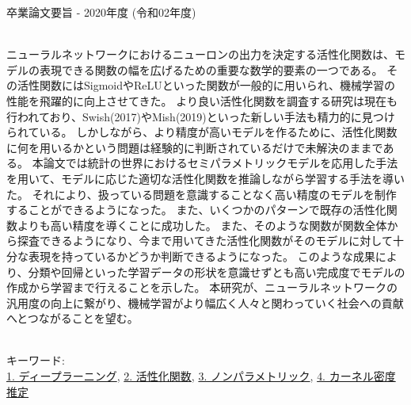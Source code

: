 卒業論文要旨 - 2020年度 (令和02年度)
\begin{center}
\begin{large}
\end{large}
\end{center}

~ \\



ニューラルネットワークにおけるニューロンの出力を決定する活性化関数は、モデルの表現できる関数の幅を広げるための重要な数学的要素の一つである。
その活性関数にはSigmoidやReLUといった関数が一般的に用いられ、機械学習の性能を飛躍的に向上させてきた。
より良い活性化関数を調査する研究は現在も行われており、Swish(2017)やMish(2019)といった新しい手法も精力的に見つけられている。
しかしながら、より精度が高いモデルを作るために、活性化関数に何を用いるかという問題は経験的に判断されているだけで未解決のままである。
本論文では統計の世界におけるセミパラメトリックモデルを応用した手法を用いて、モデルに応じた適切な活性化関数を推論しながら学習する手法を導いた。
それにより、扱っている問題を意識することなく高い精度のモデルを制作することができるようになった。
また、いくつかのパターンで既存の活性化関数よりも高い精度を導くことに成功した。
また、そのような関数が関数全体から探査できるようになり、今まで用いてきた活性化関数がそのモデルに対して十分な表現を持っているかどうか判断できるようになった。
このような成果により、分類や回帰といった学習データの形状を意識せずとも高い完成度でモデルの作成から学習まで行えることを示した。
本研究が、ニューラルネットワークの汎用度の向上に繋がり、機械学習がより幅広く人々と関わっていく社会への貢献へとつながることを望む。


~ \\
キーワード:\\
\underline{1. ディープラーニング},
\underline{2. 活性化関数},
\underline{3. ノンパラメトリック},
\underline{4. カーネル密度推定}
\begin{flushright}
\dept \\
\author
\end{flushright}
